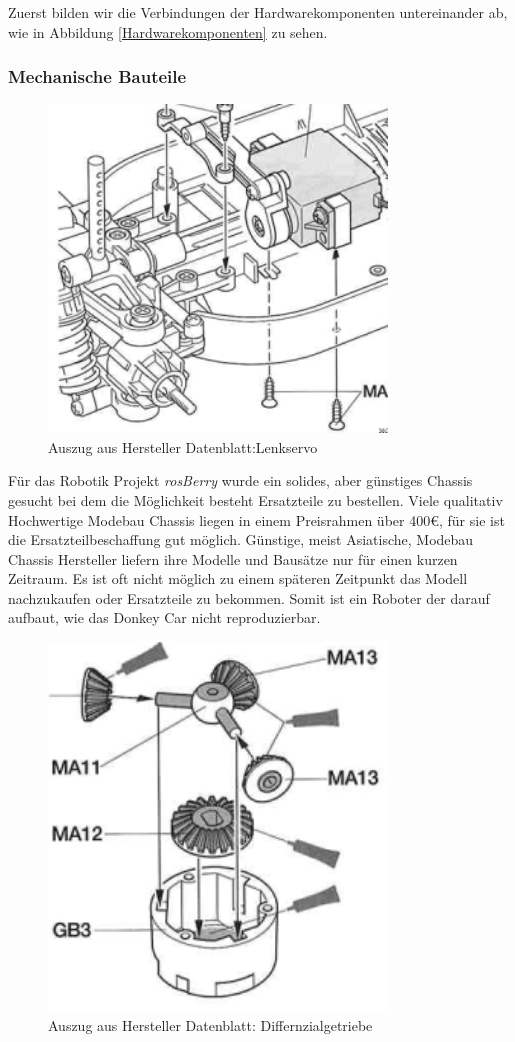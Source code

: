 \documentclass[conference]{IEEEtran}
\begin{document}
Zuerst bilden wir die Verbindungen der Hardwarekomponenten untereinander ab, wie in Abbildung \ref{Hardwarekomponenten} zu sehen.
\subsubsection{Mechanische Bauteile}

\begin{figure} %
	\centering
	\includegraphics[width=9cm]{img/Lenkung.png}
	\caption{Auszug aus Hersteller Datenblatt:Lenkservo }
	\label{Servomotor}
\end{figure}
Für das Robotik Projekt \textit{rosBerry} wurde ein solides, aber günstiges Chassis gesucht bei dem die Möglichkeit besteht Ersatzteile zu bestellen. Viele qualitativ Hochwertige Modebau Chassis liegen in einem Preisrahmen über 400€, für sie ist die Ersatzteilbeschaffung gut möglich. Günstige, meist Asiatische, Modebau Chassis Hersteller liefern ihre Modelle und Bausätze nur für einen kurzen Zeitraum. Es ist oft nicht möglich zu einem späteren Zeitpunkt das Modell nachzukaufen oder Ersatzteile zu bekommen. Somit ist ein Roboter der darauf aufbaut, wie das Donkey Car nicht reproduzierbar. 
\\
\begin{figure} %
	\centering
	\includegraphics[width=9cm]{img/differenzial.png}
	\caption{Auszug aus Hersteller Datenblatt: Differnzialgetriebe }
	\label{Getriebe}
\end{figure}
\end{document}
